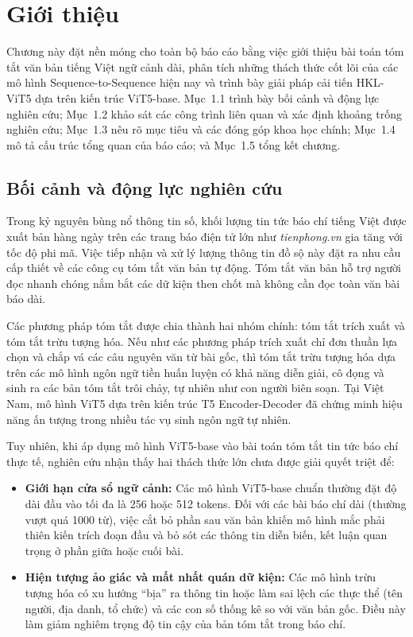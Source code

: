 \chapter{Giới thiệu}

Chương này đặt nền móng cho toàn bộ báo cáo bằng việc giới thiệu bài toán tóm tắt văn bản tiếng Việt ngữ cảnh dài, phân tích những thách thức cốt lõi của các mô hình Sequence-to-Sequence hiện nay và trình bày giải pháp cải tiến HKL-ViT5 dựa trên kiến trúc ViT5-base.
Mục~1.1 trình bày bối cảnh và động lực nghiên cứu; Mục~1.2 khảo sát các công trình liên quan và xác định khoảng trống nghiên cứu; Mục~1.3 nêu rõ mục tiêu và các đóng góp khoa học chính; Mục~1.4 mô tả cấu trúc tổng quan của báo cáo; và Mục~1.5 tổng kết chương.

\section{Bối cảnh và động lực nghiên cứu}

Trong kỷ nguyên bùng nổ thông tin số, khối lượng tin tức báo chí tiếng Việt được xuất bản hàng ngày trên các trang báo điện tử lớn như \textit{tienphong.vn} gia tăng với tốc độ phi mã. Việc tiếp nhận và xử lý lượng thông tin đồ sộ này đặt ra nhu cầu cấp thiết về các công cụ tóm tắt văn bản tự động. Tóm tắt văn bản hỗ trợ người đọc nhanh chóng nắm bắt các dữ kiện then chốt mà không cần đọc toàn văn bài báo dài.

Các phương pháp tóm tắt được chia thành hai nhóm chính: tóm tắt trích xuất và tóm tắt trừu tượng hóa. Nếu như các phương pháp trích xuất chỉ đơn thuần lựa chọn và chắp vá các câu nguyên văn từ bài gốc, thì tóm tắt trừu tượng hóa dựa trên các mô hình ngôn ngữ tiền huấn luyện có khả năng diễn giải, cô đọng và sinh ra các bản tóm tắt trôi chảy, tự nhiên như con người biên soạn. Tại Việt Nam, mô hình ViT5 \cite{Nguyen2022} dựa trên kiến trúc T5 Encoder-Decoder đã chứng minh hiệu năng ấn tượng trong nhiều tác vụ sinh ngôn ngữ tự nhiên.

Tuy nhiên, khi áp dụng mô hình ViT5-base vào bài toán tóm tắt tin tức báo chí thực tế, nghiên cứu nhận thấy hai thách thức lớn chưa được giải quyết triệt để:

\begin{itemize}
  \item \textbf{Giới hạn cửa sổ ngữ cảnh:} Các mô hình ViT5-base chuẩn thường đặt độ dài đầu vào tối đa là 256 hoặc 512 tokens. Đối với các bài báo chí dài (thường vượt quá 1000 từ), việc cắt bỏ phần sau văn bản khiến mô hình mắc phải thiên kiến trích đoạn đầu và bỏ sót các thông tin diễn biến, kết luận quan trọng ở phần giữa hoặc cuối bài.
  \item \textbf{Hiện tượng ảo giác và mất nhất quán dữ kiện:} Các mô hình trừu tượng hóa có xu hướng ``bịa'' ra thông tin hoặc làm sai lệch các thực thể (tên người, địa danh, tổ chức) và các con số thống kê so với văn bản gốc. Điều này làm giảm nghiêm trọng độ tin cậy của bản tóm tắt trong báo chí.
\end{itemize}

